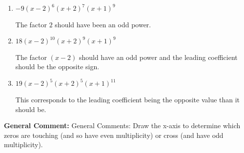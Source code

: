 \documentclass{extbook}[14pt]
\begin{document}
\begin{enumerate}
{\begin{enumerate}[label=\Alph*.]
The factors $2$ and $-2$ have have been odd power.
\item \( -9(x - 2)^{6} (x + 2)^{7} (x + 1)^{9} \)

The factor $2$ should have been an odd power.
\item \( 18(x - 2)^{10} (x + 2)^{9} (x + 1)^{9} \)

The factor $(x - 2)$ should have an odd power and the leading coefficient should be the opposite sign.
\item \( 19(x - 2)^{5} (x + 2)^{5} (x + 1)^{11} \)

This corresponds to the leading coefficient being the opposite value than it should be.
\end{enumerate}

\textbf{General Comment:} General Comments: Draw the x-axis to determine which zeros are touching (and so have even multiplicity) or cross (and have odd multiplicity).
}
\end{enumerate}
\end{document}
